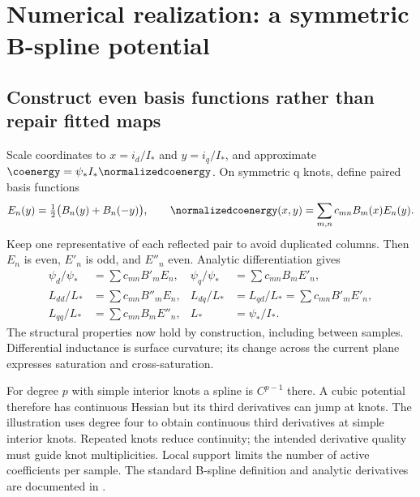 \section{Numerical realization: a symmetric B-spline potential}
\subsection{Construct even basis functions rather than repair fitted maps}
Scale coordinates to $x=i_d/I_*$ and $y=i_q/I_*$, and approximate
$\coenergy=\psi_*I_*\normalizedcoenergy$. On symmetric q knots, define paired basis functions
\begin{equation}
 E_n(y)=\tfrac12\bigl(B_n(y)+B_n(-y)\bigr),\qquad
 \normalizedcoenergy(x,y)=\sum_{m,n}c_{mn}B_m(x)E_n(y).\label{eq:spline-potential}
\end{equation}
Keep one representative of each reflected pair to avoid duplicated columns.
Then $E_n$ is even, $E'_n$ is odd, and $E''_n$ even. Analytic differentiation
gives
\begin{align}
 \psi_d/\psi_*&=\sum c_{mn}B'_mE_n,&
 \psi_q/\psi_*&=\sum c_{mn}B_mE'_n,\\
 L_{dd}/L_*&=\sum c_{mn}B''_mE_n,&
 L_{dq}/L_*&=L_{qd}/L_*=\sum c_{mn}B'_mE'_n,\\
 L_{qq}/L_*&=\sum c_{mn}B_mE''_n,&L_*&=\psi_*/I_*.
\end{align}
The structural properties now hold by construction, including between samples.
Differential inductance is surface curvature; its change across the current
plane expresses saturation and cross-saturation.

For degree $p$ with simple interior knots a spline is $C^{p-1}$ there.
A cubic potential therefore has continuous Hessian but its third derivatives
can jump at knots. The illustration uses degree four to obtain continuous
third derivatives at simple interior knots. Repeated knots reduce continuity;
the intended derivative quality must guide knot multiplicities. Local support
limits the number of active coefficients per sample. The standard B-spline
definition and analytic derivatives are documented in \cite{scipy-bspline}.

